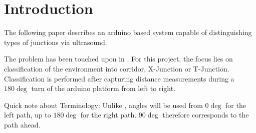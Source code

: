 \section{Introduction}
The following paper describes an arduino based system capable of distinguishing types of junctions via ultrasound.

The problem has been touched upon in \cite{article}. For this project, the focus lies on classification of the environment into corridor, X-Junction or T-Junction. Classification is performed after capturing distance measurements during a $180\deg$ turn of the arduino platform from left to right.

Quick note about Terminology: Unlike \cite{article}, angles will be used from $0\deg$ for the left path, up to $180\deg$ for the right path. $90\deg$ therefore corresponds to the path ahead.